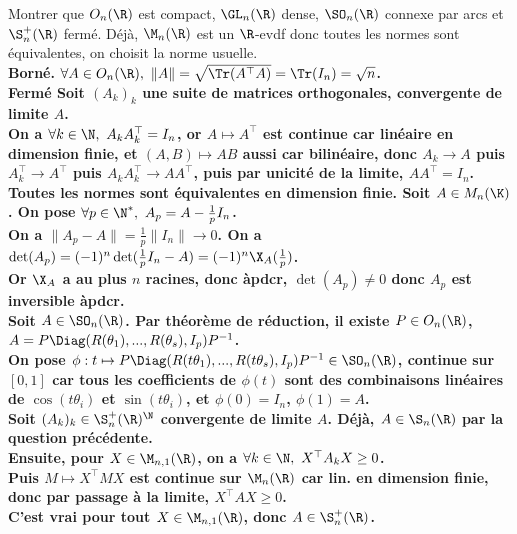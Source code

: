 \documentclass[french, 11pt]{article}
\begin{document}
\begin{question}{}{}
    Montrer que $O_n(\R)$ est compact, $\GL_n(\R)$ dense, $\SO_n(\R)$ connexe par arcs et $\S_n^{+}(\R)$ fermé.
    \tcblower
     Déjà, $\M_n(\R)$ est un $\R$-evdf donc toutes les normes sont équivalentes, on choisit la norme usuelle.\\
    \bf{Borné.} $\forall A \in O_n(\R), ~ \|A\|=\sqrt{\Tr(A^\top A)}=\Tr(I_n)=\sqrt{n}$.\\
    \bf{Fermé} Soit $(A_k)_k$ une suite de matrices orthogonales, convergente de limite $A$.\\
    On a $\forall k \in \N, ~ A_kA_k^\top=I_n$, or $A\mapsto A^\top$ est continue car linéaire en dimension finie, et $(A,B)\mapsto AB$ aussi car bilinéaire, donc $A_k\to A$ puis $A_k^\top \to A^\top$ puis $A_kA_k^\top \to AA^\top$, puis par unicité de la limite, $AA^\top = I_n$.\\
      Toutes les normes sont équivalentes en dimension finie. Soit $A\in M_n(\K)$. On pose $\forall p \in \N^*, ~ A_p = A-\frac{1}{p}I_n$.\\
    On a $\|A_p - A\| = \frac{1}{p}\|I_n\| \to 0$. On a $\det(A_p)=(-1)^n\det(\frac{1}{p}I_n-A)=(-1)^n\X_A(\frac{1}{p})$.\\
    Or $\X_A$ a au plus $n$ racines, donc àpdcr, $\det(A_p)\neq0$ donc $A_p$ est inversible àpdcr.\\
     Soit $A\in\SO_n(\R)$. Par théorème de réduction, il existe $P\in O_n(\R)$, ~ $A=P\Diag(R(\theta_1),...,R(\theta_s),I_p)P^{-1}$.\\
    On pose $\phi:t\mapsto P\Diag(R(t\theta_1),...,R(t\theta_s),I_p)P^{-1}\in\SO_n(\R)$, continue sur $[0,1]$ car tous les coefficients de $\phi(t)$ sont des combinaisons linéaires de $\cos(t\theta_i)$ et $\sin(t\theta_i)$, et $\phi(0)=I_n$, $\phi(1)=A$.\\
     Soit $(A_k)_k\in\S_n^+(\R)^\N$ convergente de limite $A$. Déjà, $A\in\S_n(\R)$ par la question précédente.\\
    Ensuite, pour $X\in\M_{n,1}(\R)$, on a $\forall k \in \N, ~ X^\top A_k X \geq 0$.\\
    Puis $M\mapsto X^\top M X$ est continue sur $\M_n(\R)$ car lin. en dimension finie, donc par passage à la limite, $X^\top AX \geq 0$.\\
    C'est vrai pour tout $X\in\M_{n,1}(\R)$, donc $A\in\S_n^+(\R)$. 
\end{question}
\end{document}
